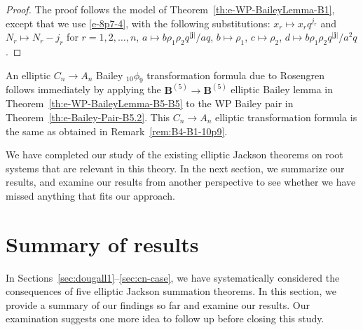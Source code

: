 \documentclass[pdftex]{sigma}
\numberwithin{equation}{section}
\newcommand\sumj{{\left| \boldsymbol {j} \right|}}
\newcommand{\B}{{ \mathbf B}}
\begin{document}
\begin{proof} The proof follows the model of Theorem~\ref{th:e-WP-BaileyLemma-B1}, except that we use \eqref{e-8p7-4}, with the following substitutions: $x_r\mapsto x_rq^{j_r}$ and $N_r\mapsto N_r-j_r$ for $r=1, 2, \dots, n$, $a\mapsto b\rho_1\rho_2q^{\sumj}/aq$, $b\mapsto \rho_1$, $c\mapsto \rho_2$, $d\mapsto b\rho_1\rho_2q^{\sumj}/a^2q$.
\end{proof}

An elliptic $C_n\to A_n$ Bailey $_{10}\phi_9$ transformation formula due to Rosengren~\cite[Corollary~8.3]{HR2004} follows immediately by applying the $\B^{(5)} \to\B^{(5)}$ elliptic Bailey lemma in Theorem~\ref{th:e-WP-BaileyLemma-B5-B5} to the WP Bailey pair in Theorem~\ref{th:e-Bailey-Pair-B5.2}. This $C_n\to A_n$ elliptic transformation formula is the same as obtained in Remark~\ref{rem:B4-B1-10p9}.

We have completed our study of the existing elliptic Jackson theorems on root systems that are relevant in this theory. In the next section, we summarize our results, and examine our results from another perspective to see whether we have missed anything that fits our approach.

\section{Summary of results}\label{sec:summary}
In Sections~\ref{sec:dougall1}--\ref{sec:cn-case}, we have systematically considered the consequences of five elliptic Jackson summation theorems. In this section, we provide a summary of our findings so far and examine our results. Our examination suggests one more idea to follow up before closing this study.
\end{document}

